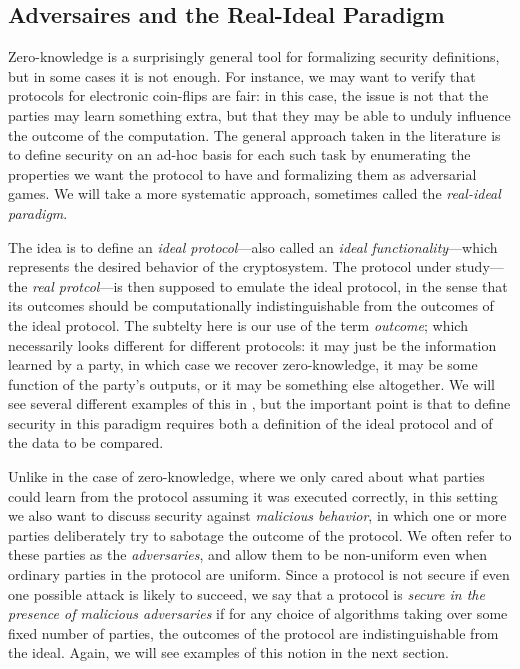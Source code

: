 \subsection{Adversaires and the Real-Ideal Paradigm}

Zero-knowledge is a surprisingly general tool for formalizing security
definitions, but in some cases it is not enough. For instance, we may want to
verify that protocols for electronic coin-flips are fair: in this case, the
issue is not that the parties may learn something extra, but that they may be
able to unduly influence the outcome of the computation. The general approach
taken in the literature is to define security on an ad-hoc basis for each such
task by enumerating the properties we want the protocol to have and formalizing
them as adversarial games. We will take a more systematic approach, sometimes
called the \emph{real-ideal paradigm}.

The idea is to define an \emph{ideal protocol}---also called an \emph{ideal
functionality}---which represents the desired behavior of the cryptosystem. The
protocol under study---the \emph{real protcol}---is then supposed to emulate the
ideal protocol, in the sense that its outcomes should be computationally
indistinguishable from the outcomes of the ideal protocol. The subtelty here is
our use of the term \emph{outcome}; which necessarily looks different for
different protocols: it may just be the information learned by a party, in which
case we recover zero-knowledge, it may be some function of the party's outputs,
or it may be something else altogether. We will see several different examples
of this in , but the important point is that to define
security in this paradigm requires both a definition of the ideal protocol and
of the data to be compared.

Unlike in the case of zero-knowledge, where we only cared about what parties
could learn from the protocol assuming it was executed correctly, in this
setting we also want to discuss security against \emph{malicious behavior}, in
which one or more parties deliberately try to sabotage the outcome of the
protocol. We often refer to these parties as the \emph{adversaries}, and allow
them to be non-uniform even when ordinary parties in the protocol are uniform.
Since a protocol is not secure if even one possible attack is likely to succeed,
we say that a protocol is \emph{secure in the presence of malicious adversaries}
if for any choice of algorithms taking over some fixed number of parties, the
outcomes of the protocol are indistinguishable from the ideal. Again, we will
see examples of this notion in the next section.

